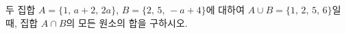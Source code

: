 두 집합 $A=\{1,\,a+2,\,2a\}$, $B=\{2,\,5,\,-a+4\}$에 대하여 $A\cup B=\{1,\,2,\,5,\,6\}$일 때, 집합 $A\cap B$의 모든 원소의 합을 구하시오. 
